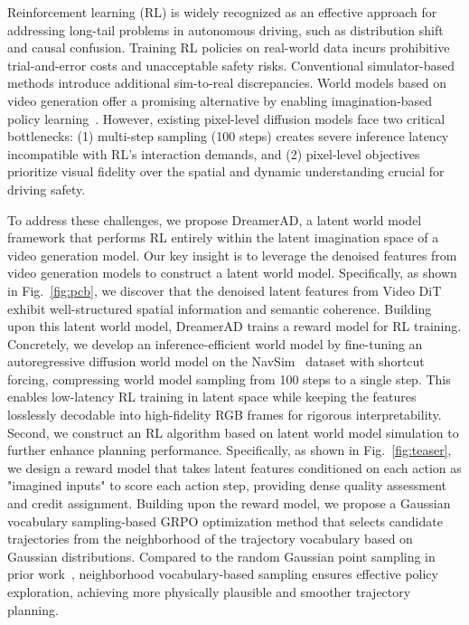 \documentclass[runningheads]{llncs}
\begin{document}
Reinforcement learning (RL) is widely recognized as an effective approach for addressing long-tail problems in autonomous driving, such as distribution shift and causal confusion. Training RL policies on real-world data incurs prohibitive trial-and-error costs and unacceptable safety risks. Conventional simulator-based methods introduce additional sim-to-real discrepancies. 
World models based on video generation offer a promising alternative by enabling imagination-based policy learning~\cite{jiang2026wovr, jiang2025world4rl}. However, existing pixel-level diffusion models\cite{zhang2025epona} face two critical bottlenecks: (1) multi-step sampling (100 steps) creates severe inference latency incompatible with RL's interaction demands, and (2) pixel-level objectives prioritize visual fidelity over the spatial and dynamic understanding crucial for driving safety.

To address these challenges, we propose DreamerAD, a latent world model framework that performs RL entirely within the latent imagination space of a video generation model. Our key insight is to leverage the denoised features from video generation models to construct a latent world model. Specifically, as shown in Fig.~\ref{fig:pcb}, we discover that the denoised latent features from Video DiT exhibit well-structured spatial information and semantic coherence. Building upon this latent world model, DreamerAD trains a reward model for RL training.
Concretely, we develop an inference-efficient world model by fine-tuning an autoregressive diffusion world model on the NavSim~\cite{im2024navsim} dataset with shortcut forcing, compressing world model sampling from 100 steps to a single step. This enables low-latency RL training in latent space while keeping the features losslessly decodable into high-fidelity RGB frames for rigorous interpretability.
Second, we construct an RL algorithm based on latent world model simulation to further enhance planning performance. Specifically, as shown in Fig.~\ref{fig:teaser}, we design a reward model that takes latent features conditioned on each action as "imagined inputs" to score each action step, providing dense quality assessment and credit assignment. Building upon the reward model, we propose a Gaussian vocabulary sampling-based GRPO optimization method that selects candidate trajectories from the neighborhood of the trajectory vocabulary based on Gaussian distributions. Compared to the random Gaussian point sampling in prior work~\cite{yang2025worldrft}, neighborhood vocabulary-based sampling ensures effective policy exploration, achieving more physically plausible and smoother trajectory planning.
\end{document}
